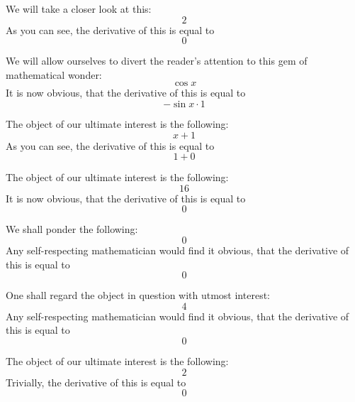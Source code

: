 \documentclass{article}
\begin{document}
We will take a closer look at this:
\begin{equation}
2 
\end{equation}
As you can see, the derivative of this is equal to
\begin{equation}
0 
\end{equation}

We will allow ourselves to divert the reader's attention to this gem of mathematical wonder:
\begin{equation}
\cos x 
\end{equation}
It is now obvious, that the derivative of this is equal to
\begin{equation}
-\sin x \cdot 1 
\end{equation}

The object of our ultimate interest is the following:
\begin{equation}
x + 1 
\end{equation}
As you can see, the derivative of this is equal to
\begin{equation}
1 + 0 
\end{equation}

The object of our ultimate interest is the following:
\begin{equation}
16 
\end{equation}
It is now obvious, that the derivative of this is equal to
\begin{equation}
0 
\end{equation}

We shall ponder the following:
\begin{equation}
0 
\end{equation}
Any self-respecting mathematician would find it obvious, that the derivative of this is equal to
\begin{equation}
0 
\end{equation}

One shall regard the object in question with utmost interest:
\begin{equation}
4 
\end{equation}
Any self-respecting mathematician would find it obvious, that the derivative of this is equal to
\begin{equation}
0 
\end{equation}

The object of our ultimate interest is the following:
\begin{equation}
2 
\end{equation}
Trivially, the derivative of this is equal to
\begin{equation}
0 
\end{equation}
\end{document}
